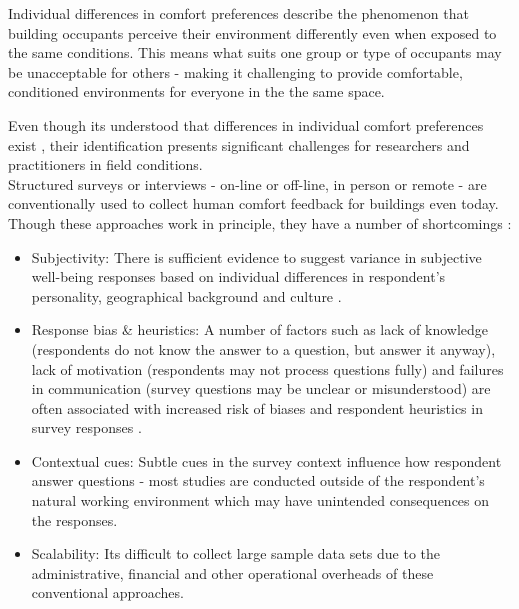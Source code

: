 

Individual differences in comfort preferences describe the phenomenon that building occupants perceive their environment differently even when exposed to the same conditions. This means what suits one group or type of occupants may be unacceptable for others - making it challenging to provide comfortable, conditioned environments for everyone in the the same space.

Even though its understood that differences in individual comfort preferences exist \cite{WANG2018181}, their identification presents significant challenges for researchers and practitioners in field conditions.\\

Structured surveys or interviews - on-line or off-line, in person or remote - are conventionally used to collect human comfort feedback for buildings even today. Though these approaches work in principle, they have a number of shortcomings \cite{organisationforeconomicco-operationanddevelopment(oecd)_2013}:  

\begin{itemize}
  \item Subjectivity: There is sufficient evidence to suggest variance in subjective well-being responses based on individual differences in respondent's personality, geographical background and culture \cite{doi:10.1146/annurev.psych.54.101601.145056}.
  \item Response bias \& heuristics: A number of factors such as lack of knowledge (respondents do not know the answer to a question, but answer it anyway), lack of motivation (respondents may not process questions fully) and failures in communication (survey questions may be unclear or misunderstood) are often associated with increased risk of biases and respondent heuristics in survey responses \cite{bradburn2004asking}.
  \item Contextual cues: Subtle cues in the survey context influence how respondent answer questions \cite{krosnick1997seymour} - most studies are conducted outside of the respondent's natural working environment which may have unintended consequences on the responses. 
  \item Scalability: Its difficult to collect large sample data sets due to the administrative, financial and other operational overheads of these conventional approaches.
\end{itemize}


